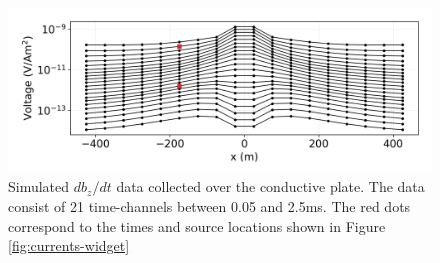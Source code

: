 \begin{figure}
    \begin{center}
    \includegraphics[width=\columnwidth]{figures/aem-data.png}
    \end{center}
\caption{
    Simulated $db_z/dt$ data collected over the conductive plate. The data consist of 21 time-channels between 0.05 and 2.5ms. The red dots correspond to the times and source locations shown in Figure \ref{fig:currents-widget}
}
\label{fig:aem-data}
\end{figure}

